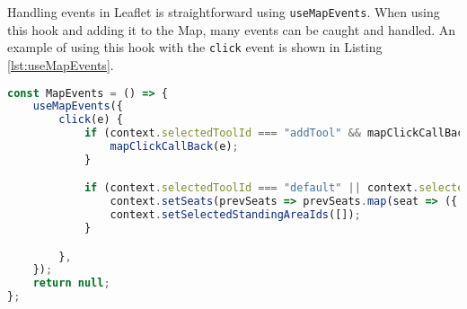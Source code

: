 Handling events in Leaflet is straightforward using \texttt{useMapEvents}. When using this hook and adding it to the Map, many events can be caught and handled. An example of using this hook with the \texttt{click} event is shown in Listing \ref{lst:useMapEvents}.

\begin{lstlisting}[language=Typescript, caption={Handling Events in Leaflet},label={lst:useMapEvents}]
const MapEvents = () => {
    useMapEvents({
        click(e) {
            if (context.selectedToolId === "addTool" && mapClickCallBack) {
                mapClickCallBack(e);
            }

            if (context.selectedToolId === "default" || context.selectedToolId === "") {
                context.setSeats(prevSeats => prevSeats.map(seat => ({ ...seat, selected: false })));
                context.setSelectedStandingAreaIds([]);
            }

        },
    });
    return null;
};
\end{lstlisting}
